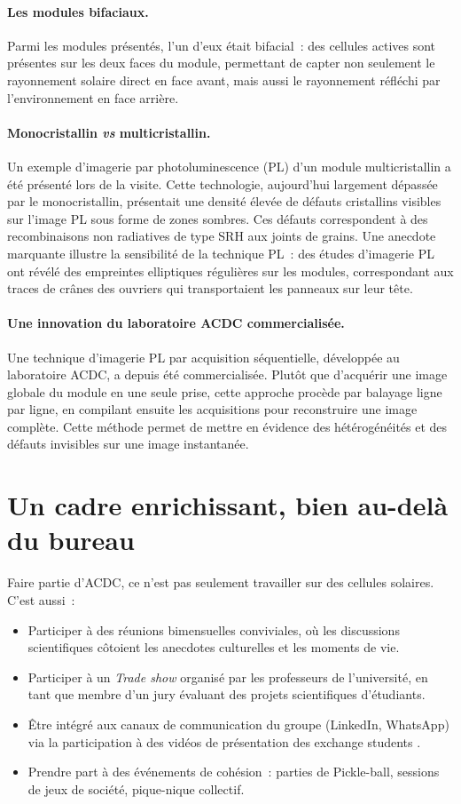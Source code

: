 \documentclass[12pt,a4paper]{report}
\begin{document}
\paragraph{Les modules bifaciaux.}
Parmi les modules présentés, l'un d'eux était bifacial~: des cellules actives sont présentes sur les deux faces du module, permettant de capter non seulement le rayonnement solaire direct en face avant, mais aussi le rayonnement réfléchi par l'environnement en face arrière.

\paragraph{Monocristallin \textit{vs} multicristallin.}
Un exemple d'imagerie par photoluminescence (PL) d'un module multicristallin a été présenté lors de la visite. Cette technologie, aujourd'hui largement dépassée par le monocristallin, présentait une densité élevée de défauts cristallins visibles sur l'image PL sous forme de zones sombres. Ces défauts correspondent à des recombinaisons non radiatives de type SRH aux joints de grains. Une anecdote marquante illustre la sensibilité de la technique PL~: des études d'imagerie PL ont révélé des empreintes elliptiques régulières sur les modules, correspondant aux traces de crânes des ouvriers qui transportaient les panneaux sur leur tête.

\paragraph{Une innovation du laboratoire ACDC commercialisée.}
Une technique d'imagerie PL par acquisition séquentielle, développée au laboratoire ACDC, a depuis été commercialisée. Plutôt que d'acquérir une image globale du module en une seule prise, cette approche procède par balayage ligne par ligne, en compilant ensuite les acquisitions pour reconstruire une image complète. Cette méthode permet de mettre en évidence des hétérogénéités et des défauts invisibles sur une image instantanée.

\section{Un cadre enrichissant, bien au-delà du bureau}

Faire partie d'ACDC, ce n'est pas seulement travailler sur des cellules solaires. C'est aussi~:
\begin{itemize}
  \item Participer à des réunions bimensuelles conviviales, où les discussions scientifiques côtoient les anecdotes culturelles et les moments de vie.
  \item Participer à un \textit{Trade show} organisé par les professeurs de l'université, en tant que membre d'un jury évaluant des projets scientifiques d'étudiants.
  \item Être intégré aux canaux de communication du groupe (LinkedIn, WhatsApp) via la participation à des vidéos de présentation des \og exchange students \fg{}.
  \item Prendre part à des événements de cohésion~: parties de Pickle-ball, sessions de jeux de société, pique-nique collectif.
\end{itemize}
\end{document}
